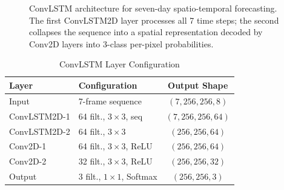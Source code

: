 \documentclass[conference]{IEEEtran}
\begin{document}
\begin{figure}[htbp]
\centering
{}
\caption{ConvLSTM architecture for seven-day spatio-temporal forecasting.
The first ConvLSTM2D layer processes all 7 time steps; the second
collapses the sequence into a spatial representation decoded by Conv2D
layers into 3-class per-pixel probabilities.}
\label{fig:convlstm_arch}
\end{figure}

\begin{table}[htbp]
\caption{ConvLSTM Layer Configuration}
\label{tab:convlstm_arch}
\centering
\footnotesize
\begin{tabular}{llc}
\toprule
\textbf{Layer} & \textbf{Configuration} & \textbf{Output Shape}\\
\midrule
Input         & 7-frame sequence       & $(7, 256, 256, 8)$\\
ConvLSTM2D-1  & 64 filt., $3\!\times\!3$, seq & $(7, 256, 256, 64)$\\
ConvLSTM2D-2  & 64 filt., $3\!\times\!3$      & $(256, 256, 64)$\\
Conv2D-1      & 64 filt., $3\!\times\!3$, ReLU & $(256, 256, 64)$\\
Conv2D-2      & 32 filt., $3\!\times\!3$, ReLU & $(256, 256, 32)$\\
Output        & 3 filt., $1\!\times\!1$, Softmax & $(256, 256, 3)$\\
\bottomrule
\end{tabular}
\end{table}
\end{document}
